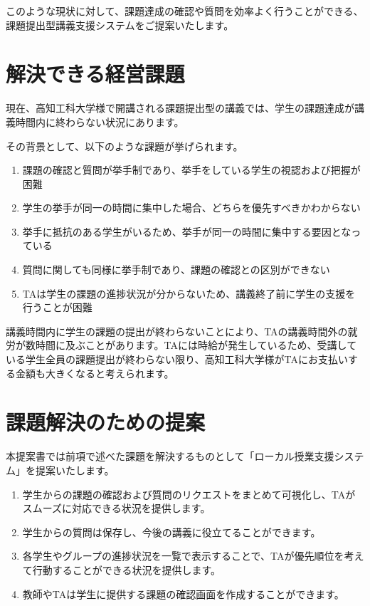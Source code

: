 \documentclass[a4j,titlepage]{ujarticle}
\begin{document}
このような現状に対して、課題達成の確認や質問を効率よく行うことができる、課題提出型講義支援システムをご提案いたします。

\section{解決できる経営課題}
現在、高知工科大学様で開講される課題提出型の講義では、学生の課題達成が講義時間内に終わらない状況にあります。

その背景として、以下のような課題が挙げられます。
\begin{enumerate}[(1)]
\item 課題の確認と質問が挙手制であり、挙手をしている学生の視認および把握が困難
\item 学生の挙手が同一の時間に集中した場合、どちらを優先すべきかわからない
\item 挙手に抵抗のある学生がいるため、挙手が同一の時間に集中する要因となっている
\item 質問に関しても同様に挙手制であり、課題の確認との区別ができない
\item TAは学生の課題の進捗状況が分からないため、講義終了前に学生の支援を行うことが困難
\end{enumerate}
講義時間内に学生の課題の提出が終わらないことにより、TAの講義時間外の就労が数時間に及ぶことがあります。TAには時給が発生しているため、受講している学生全員の課題提出が終わらない限り、高知工科大学様がTAにお支払いする金額も大きくなると考えられます。

\section{課題解決のための提案}
本提案書では前項で述べた課題を解決するものとして「ローカル授業支援システム」を提案いたします。

\begin{enumerate}[(1)]
\item 学生からの課題の確認および質問のリクエストをまとめて可視化し、TAがスムーズに対応できる状況を提供します。
\item 学生からの質問は保存し、今後の講義に役立てることができます。
\item 各学生やグループの進捗状況を一覧で表示することで、TAが優先順位を考えて行動することができる状況を提供します。
\item 教師やTAは学生に提供する課題の確認画面を作成することができます。
\end{enumerate}
\end{document}
